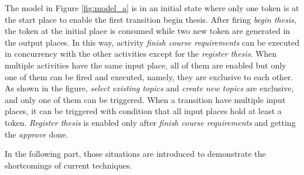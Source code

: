 The model in Figure \ref{fig:model_a} is in an initial state where only one token is at the start place to enable the first transition begin thesis. After firing \emph{begin thesis}, the token at the initial place is consumed while two new token are generated in the output places. In this way, activity \emph{finish course requirements}  can be executed in concurrency with the other activities except for the \emph{register thesis}. When multiple activities have the same input place, all of them are enabled but only one of them can be fired and executed, namely, they are exclusive to each other. As shown in the figure,  \emph{select existing topics}  and \emph{create new topics} are exclusive, and only one of them can be triggered. When a transition have multiple input places, it can be triggered with condition that all input places hold at least a token. \emph{Register thesis} is enabled only after \emph{finish course requirements} and getting the \emph{approve} done. 


In the following part, those situations are introduced to demonstrate the shortcomings of current techniques. 
